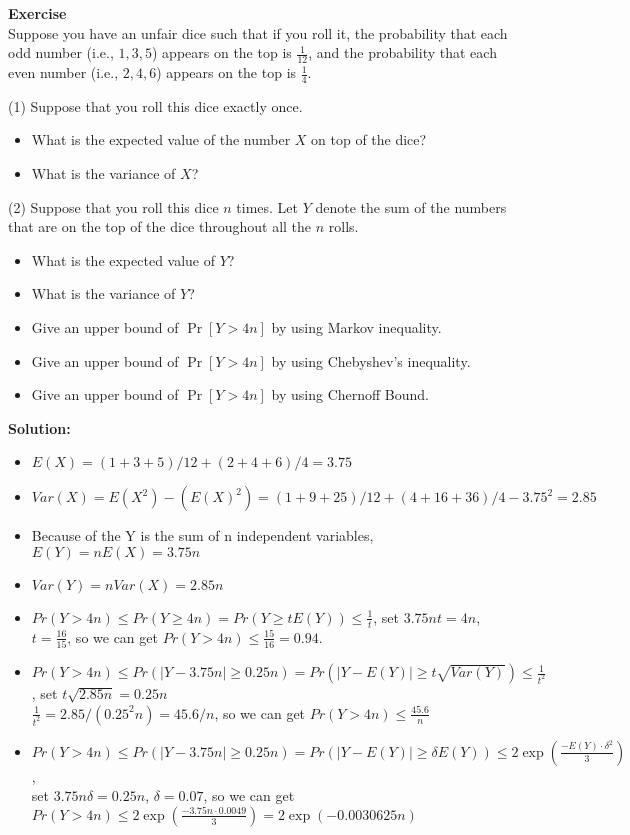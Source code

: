 \documentclass[a4paper,10pt]{article}
\newcounter{aufgc}
\newenvironment{exercise}[1]%
{\refstepcounter{aufgc}\textbf{Exercise \arabic{aufgc}} \emph{#1}\\}
{
	
	\hrulefill\medskip}%
\begin{document}
\begin{exercise}{}

	Suppose you have an unfair dice such that if you roll it, the probability that each odd number (i.e., $1,3,5$) appears on the top is $\frac{1}{12}$, and the probability that each even number (i.e., $2,4,6$) appears on the top is $\frac{1}{4}$.

	(1) Suppose that you roll this dice exactly once.
	\begin{itemize}
		\item What is the expected value of the number $X$ on top of the dice?
		\item What is the variance of $X$?
	\end{itemize}



	(2) Suppose that you roll this dice $n$ times. Let $Y$ denote the sum of the numbers that are on the top of the dice throughout all the $n$ rolls.
	\begin{itemize}
		\item What is the expected value of $Y$?
		\item What is the variance of $Y$?
		\item Give an upper bound of $\Pr[Y> 4n]$ by using Markov inequality.
		\item Give an upper bound of $\Pr[Y> 4n]$ by using Chebyshev's inequality.
		\item Give an upper bound of $\Pr[Y> 4n]$ by using Chernoff Bound.
	\end{itemize}

	\textbf{Solution:} 
	\begin{itemize}
		\item  $E(X)=(1+3+5)/12+(2+4+6)/4 = 3.75$
		\item  $Var(X)= E(X^2) - (E(X)^2) = (1+9+25)/12+(4+16+36)/4-3.75^2=2.85$
		\item  Because of the Y is the sum of n independent variables, $E(Y)=nE(X) = 3.75n$
		\item  $Var(Y)=nVar(X) = 2.85n$
		\item  $Pr(Y>4n) \le Pr(Y \ge 4n) = Pr(Y \ge tE(Y)) \le \frac{1}{t}$, set $3.75nt=4n$, $t=\frac{16}{15}$, so we can get $Pr(Y>4n) \le \frac{15}{16} = 0.94$.
		\item  $Pr(Y>4n) \le Pr(|Y-3.75n| \ge 0.25n) = Pr(|Y-E(Y)| \ge t\sqrt{Var(Y)}) \le \frac{1}{t^2}$, set $t\sqrt{2.85n}=0.25n$ \\
		      $ \frac{1}{t^2 }= 2.85/(0.25^2n)=45.6/n$, so we can get $Pr(Y>4n) \le \frac{45.6}{n}$
		\item  $Pr(Y>4n) \le Pr(|Y-3.75n| \ge 0.25n) = Pr(|Y-E(Y)| \ge \delta E(Y)) \le 2\exp(\frac{-E(Y) \cdot \delta^2 }{3})$,\\
		      set $3.75n\delta=0.25n$, $\delta = 0.07$, so we can get $Pr(Y>4n) \le 2\exp(\frac{-3.75n \cdot0.0049 }{3}) = 2\exp(-0.0030625n)$
	\end{itemize}


\end{exercise}
\end{document}
